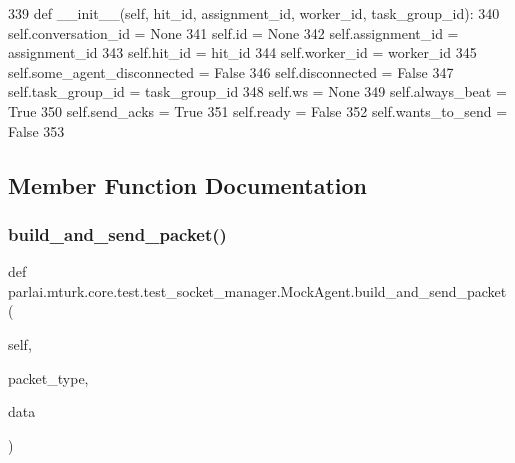 \begin{DoxyCode}
339     \textcolor{keyword}{def }\_\_init\_\_(self, hit\_id, assignment\_id, worker\_id, task\_group\_id):
340         self.conversation\_id = \textcolor{keywordtype}{None}
341         self.id = \textcolor{keywordtype}{None}
342         self.assignment\_id = assignment\_id
343         self.hit\_id = hit\_id
344         self.worker\_id = worker\_id
345         self.some\_agent\_disconnected = \textcolor{keyword}{False}
346         self.disconnected = \textcolor{keyword}{False}
347         self.task\_group\_id = task\_group\_id
348         self.ws = \textcolor{keywordtype}{None}
349         self.always\_beat = \textcolor{keyword}{True}
350         self.send\_acks = \textcolor{keyword}{True}
351         self.ready = \textcolor{keyword}{False}
352         self.wants\_to\_send = \textcolor{keyword}{False}
353 
\end{DoxyCode}


\subsection{Member Function Documentation}
\mbox{\label{classparlai_1_1mturk_1_1core_1_1test_1_1test__socket__manager_1_1MockAgent_a0ed4ae8ea1b3bc86f3397bd4dadf2d40}} 
\subsubsection{\texorpdfstring{build\+\_\+and\+\_\+send\+\_\+packet()}{build\_and\_send\_packet()}}
{\footnotesize\ttfamily def parlai.\+mturk.\+core.\+test.\+test\+\_\+socket\+\_\+manager.\+Mock\+Agent.\+build\+\_\+and\+\_\+send\+\_\+packet (\begin{DoxyParamCaption}\item[{}]{self,  }\item[{}]{packet\+\_\+type,  }\item[{}]{data }\end{DoxyParamCaption})}



